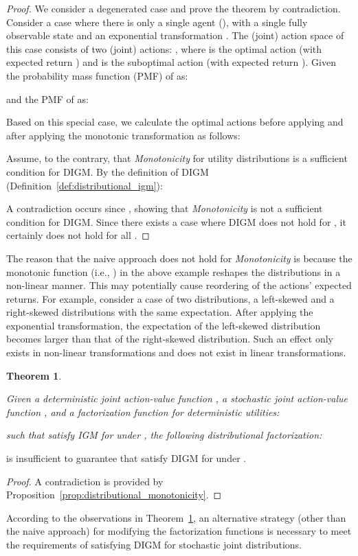 \documentclass[twoside,11pt]{article}
\newcommand{\monotonicity}{\textit{Monotonicity}}
\newcommand{\digm}{DIGM}
\newcounter{example0}
\newcounter{theorem0}
\newcounter{definition0}
\newtheorem{theorem}[theorem0]{Theorem}
\begin{document}
\begin{proof}
We consider a degenerated case and prove the theorem by contradiction. Consider a case where there is only a single agent (), with a single fully observable state and an exponential transformation . The (joint) action space of this case consists of two (joint) actions: , where  is the optimal action (with expected return ) and  is the suboptimal action (with expected return ). Given the probability mass function (PMF) of  as:

and the PMF of  as:

Based on this special case, we calculate the optimal actions before applying and after applying the monotonic transformation as follows:

Assume, to the contrary, that \monotonicity{} for utility distributions is a sufficient condition for DIGM. By the definition of DIGM (Definition~\ref{def:distributional_igm}):

A contradiction occurs since , showing that \monotonicity{} is not a sufficient condition for DIGM. Since there exists a case where DIGM does not hold for , it certainly does not hold for all .
\end{proof} The reason that the naive approach does not hold for \monotonicity{} is because the monotonic function (i.e., ) in the above example
reshapes the distributions in a non-linear manner. This may potentially cause reordering of the actions’ expected returns. For example, consider a case of two distributions, a left-skewed and a right-skewed distributions with the same expectation. After applying the exponential transformation, the expectation of the left-skewed distribution becomes larger than that of the right-skewed distribution. Such an effect only exists in non-linear transformations and does not exist in linear transformations.
\begin{theorem}
\label{thm:distributional_igm}

Given a deterministic joint action-value function , a stochastic joint action-value function , and a factorization function  for deterministic utilities:

such that  satisfy IGM for  under , the following distributional factorization:

\end{theorem}
is insufficient to guarantee that  satisfy \digm{} for  under .

\begin{proof}
A contradiction is provided by Proposition~\ref{prop:distributional_monotonicity}.
\end{proof} According to the observations in Theorem~\ref{thm:distributional_igm}, an alternative strategy (other than the naive approach) for modifying the factorization functions is necessary to meet the requirements of satisfying \digm{} for stochastic joint distributions.
\end{document}
